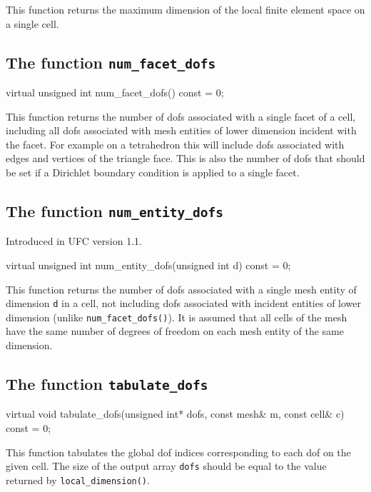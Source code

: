 This function returns the maximum dimension of the local finite element space
on a single cell.

\subsection{The function \texttt{num\_facet\_dofs}}

\begin{code}
virtual unsigned int num_facet_dofs() const = 0;
\end{code}

This function returns the number of dofs associated with a single facet
of a cell, including all dofs associated with mesh entities of lower
dimension incident with the facet. For example on a tetrahedron this
will include dofs associated with edges and vertices of the triangle face.
This is also the number of dofs that should be set if a Dirichlet
boundary condition is applied to a single facet.

\subsection{The function \texttt{num\_entity\_dofs}}
Introduced in UFC version 1.1.

\begin{code}
virtual unsigned int num_entity_dofs(unsigned int d) const = 0;
\end{code}

This function returns the number of dofs associated with a single
mesh entity of dimension \texttt{d} in a cell, not including
dofs associated with incident entities of lower dimension
(unlike \texttt{num\_facet\_dofs()}).
It is assumed that all cells of the mesh have the same number
of degrees of freedom on each mesh entity of the same dimension.

\subsection{The function \texttt{tabulate\_dofs}}

\begin{code}
virtual void tabulate_dofs(unsigned int* dofs,
                           const mesh& m,
                           const cell& c) const = 0;
\end{code}

This function tabulates the global dof indices corresponding to each
dof on the given cell. The size of the output array \texttt{dofs}
should be equal to the value returned by \texttt{local\_dimension()}.

